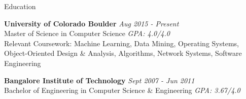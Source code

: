 
\begin{rSection}{Education}

{\bf University of Colorado Boulder} \hfill {\em Aug 2015 - Present}
\\ Master of Science in Computer Science \hfill {\em GPA: 4.0/4.0}
\\ Relevant Coursework: Machine Learning, Data Mining, Operating Systems, Object-Oriented Design \& Analysis, Algorithms, Network Systems, Software Engineering

{\bf Bangalore Institute of Technology} \hfill {\em Sept 2007 - Jun 2011}
\\ Bachelor of Engineering in Computer Science \& Engineering \hfill {\em GPA: 3.67/4.0}

\end{rSection}

